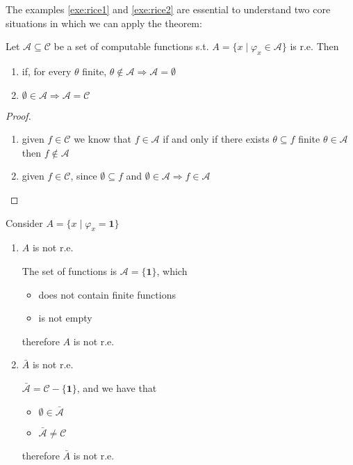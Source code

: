 The examples \ref{exe:rice1} and \ref{exe:rice2} are essential to
understand two core situations in which we can apply the theorem:
\begin{observation}
  Let $\mathcal{A} \subseteq \mathcal{C}$ be a set of computable
  functions s.t. $A = \{ x \mid \varphi_x \in \mathcal{A}\}$ is
  r.e. Then
  \begin{enumerate}
  \item if, for every \(\theta \) finite,
    \( \theta \notin \mathcal{A} \Rightarrow \mathcal{A} = \emptyset\)
  \item
    \(\emptyset \in \mathcal{A} \Rightarrow \mathcal{A} =
    \mathcal{C}\)
  \end{enumerate}
  \begin{proof}
    \begin{enumerate}
    \item given $f \in \mathcal{C}$ we know that $f \in \mathcal{A}$
      if and only if there exists $\theta \subseteq f$ finite
      $\theta \in \mathcal{A}$ then $f \notin \mathcal{A}$
    \item given $f \in \mathcal{C}$, since $\emptyset \subseteq f$ and
      $\emptyset \in \mathcal{A} \Rightarrow f \in \mathcal{A}$
    \end{enumerate}
  \end{proof}
\end{observation}

\begin{example}
  Consider $A = \{x \mid \varphi_x = \mathbf{1}\}$
  \begin{enumerate}
  \item $A$ is not r.e.

    The set of functions is
    $\mathcal{A} = \{\mathbf{1}\}$, which
    \begin{itemize}
    \item does not contain finite functions
    \item is not empty
    \end{itemize}
    therefore $A$ is not r.e.

  \item $\bar{A}$ is not r.e.

    $\bar{\mathcal{A}} = \mathcal{C} - \{\mathbf{1}\}$, and we
    have that
    \begin{itemize}
    \item $\emptyset \in \bar{\mathcal{A}}$
    \item $\bar{\mathcal{A}} \neq \mathcal{C}$
    \end{itemize}
    therefore $\bar{A}$ is not r.e.
  \end{enumerate}
\end{example}

